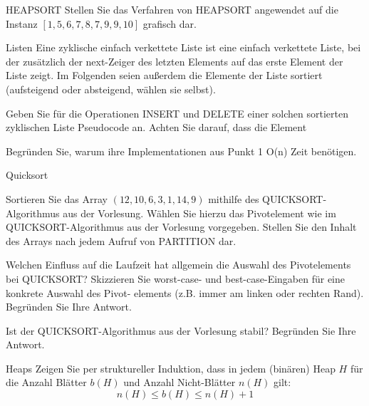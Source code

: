 \documentclass{exercisesheet}
\begin{document}
\begin{exercise}{HEAPSORT}
  Stellen Sie das Verfahren von HEAPSORT angewendet auf die Instanz $[1,5,6,7,8,7,9,9,10]$ grafisch dar.
\end{exercise}

\begin{eexercises}{Listen}{
    Eine zyklische einfach verkettete Liste ist eine einfach verkettete Liste, bei der zusätzlich der next-Zeiger des letzten Elements auf das erste Element der Liste zeigt. Im Folgenden seien außerdem die Elemente der Liste sortiert (aufsteigend oder absteigend, wählen sie selbst).
  }
  \item Geben Sie für die Operationen INSERT und DELETE einer solchen sortierten zyklischen Liste Pseudocode an. Achten Sie darauf, dass die Element
  \item Begründen Sie, warum ihre Implementationen aus Punkt 1 O(n) Zeit benötigen.
\end{eexercises}

\begin{exercises}{Quicksort}
\item Sortieren Sie das Array $(12, 10, 6, 3, 1, 14, 9)$ mithilfe des QUICKSORT-Algorithmus aus der Vorlesung. Wählen Sie hierzu das Pivotelement wie im QUICKSORT-Algorithmus aus der Vorlesung vorgegeben. Stellen Sie den Inhalt des Arrays nach jedem Aufruf von PARTITION dar.
\item Welchen Einfluss auf die Laufzeit hat allgemein die Auswahl des Pivotelements bei QUICKSORT? Skizzieren Sie worst-case- und best-case-Eingaben für eine konkrete Auswahl des Pivot- elements (z.B. immer am linken oder rechten Rand). Begründen Sie Ihre Antwort.
\item Ist der QUICKSORT-Algorithmus aus der Vorlesung stabil? Begründen Sie Ihre Antwort.
\end{exercises}

\begin{exercise}{Heaps}
  Zeigen Sie per struktureller Induktion, dass in jedem (binären) Heap $H$ für die Anzahl Blätter $b(H)$ und Anzahl Nicht-Blätter $n(H)$ gilt:
  \begin{equation*}
    n(H) \leq b(H) \leq n(H)+1
  \end{equation*}
\end{exercise}
\end{document}
